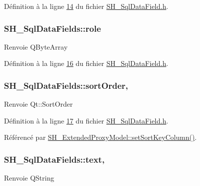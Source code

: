 Définition à la ligne \hyperlink{SH__SqlDataField_8h_source_l00014}{14} du fichier \hyperlink{SH__SqlDataField_8h_source}{S\-H\-\_\-\-Sql\-Data\-Field.\-h}.

\hypertarget{classSH__SqlDataFields_ab6e952a2dfb87525307e7aff36ac8abc}{
\subsubsection[{role}]{\setlength{\rightskip}{0pt plus 5cm}S\-H\-\_\-\-Sql\-Data\-Fields\-::role\hspace{0.3cm}{\ttfamily [read]}}}\label{classSH__SqlDataFields_ab6e952a2dfb87525307e7aff36ac8abc}
\begin{DoxyReturn}{Renvoie}
Q\-Byte\-Array 
\end{DoxyReturn}


Définition à la ligne \hyperlink{SH__SqlDataField_8h_source_l00016}{16} du fichier \hyperlink{SH__SqlDataField_8h_source}{S\-H\-\_\-\-Sql\-Data\-Field.\-h}.

\hypertarget{classSH__SqlDataFields_a67b20d296535d6b9dda6c85f75427ad1}{
\subsubsection[{sort\-Order}]{\setlength{\rightskip}{0pt plus 5cm}S\-H\-\_\-\-Sql\-Data\-Fields\-::sort\-Order\hspace{0.3cm}{\ttfamily [read]}, {\ttfamily [write]}}}\label{classSH__SqlDataFields_a67b20d296535d6b9dda6c85f75427ad1}
\begin{DoxyReturn}{Renvoie}
Qt\-::\-Sort\-Order 
\end{DoxyReturn}


Définition à la ligne \hyperlink{SH__SqlDataField_8h_source_l00017}{17} du fichier \hyperlink{SH__SqlDataField_8h_source}{S\-H\-\_\-\-Sql\-Data\-Field.\-h}.



Référencé par \hyperlink{classSH__ExtendedProxyModel_ab8123244a5060aa35f5bce651046b99d}{S\-H\-\_\-\-Extended\-Proxy\-Model\-::set\-Sort\-Key\-Column()}.

\hypertarget{classSH__SqlDataFields_aaffdb7a0a20775a3ea44a4c3eb5dc23d}{
\subsubsection[{text}]{\setlength{\rightskip}{0pt plus 5cm}S\-H\-\_\-\-Sql\-Data\-Fields\-::text\hspace{0.3cm}{\ttfamily [read]}, {\ttfamily [write]}}}\label{classSH__SqlDataFields_aaffdb7a0a20775a3ea44a4c3eb5dc23d}
\begin{DoxyReturn}{Renvoie}
Q\-String 
\end{DoxyReturn}


